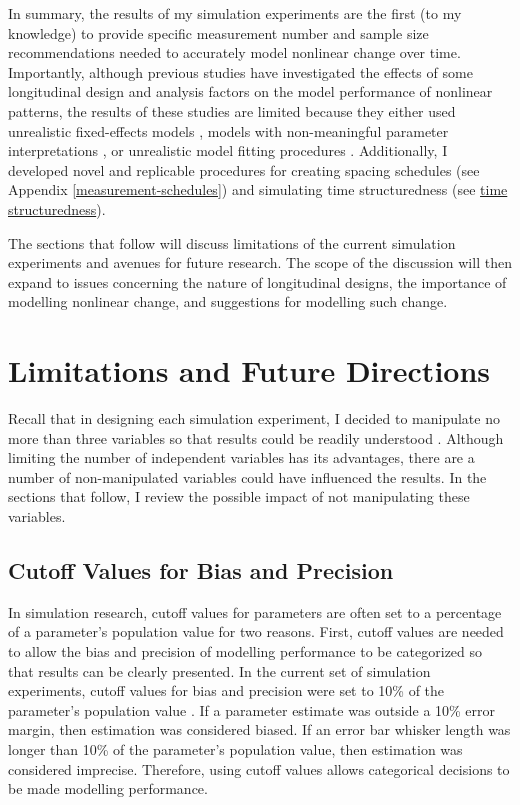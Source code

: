 \documentclass[
12pt, %
twoside,
english]{guelphthesis}
\begin{document}
In summary, the results of my simulation experiments are the first (to my knowledge) to provide specific measurement number and sample size recommendations needed to accurately model nonlinear change over time. Importantly, although previous studies have investigated the effects of some longitudinal design and analysis factors on the model performance of nonlinear patterns, the results of these studies are limited because they either used unrealistic fixed-effects models \autocite[e.g.,][]{finch2017}, models with non-meaningful parameter interpretations \autocites[e.g.,][]{fine2019,liu2022}, or unrealistic model fitting procedures \autocite{finch2017}. Additionally, I developed novel and replicable procedures for creating spacing schedules (see Appendix \ref{measurement-schedules}) and simulating time structuredness (see \protect\hyperlink{simulating-time-struc}{time structuredness}).

The sections that follow will discuss limitations of the current simulation experiments and avenues for future research. The scope of the discussion will then expand to issues concerning the nature of longitudinal designs, the importance of modelling nonlinear change, and suggestions for modelling such change.

\hypertarget{limitations-and-future-directions}{%
\section{Limitations and Future Directions}\label{limitations-and-future-directions}}

Recall that in designing each simulation experiment, I decided to manipulate no more than three variables so that results could be readily understood \autocite{halford2005}. Although limiting the number of independent variables has its advantages, there are a number of non-manipulated variables could have influenced the results. In the sections that follow, I review the possible impact of not manipulating these variables.

\hypertarget{cutoff-values-for-bias-and-precision}{%
\subsection{Cutoff Values for Bias and Precision}\label{cutoff-values-for-bias-and-precision}}

In simulation research, cutoff values for parameters are often set to a percentage of a parameter's population value \autocite[e.g.,][]{muthen1997} for two reasons. First, cutoff values are needed to allow the bias and precision of modelling performance to be categorized so that results can be clearly presented. In the current set of simulation experiments, cutoff values for bias and precision were set to 10\% of the parameter's population value \autocite{muthen1997}. If a parameter estimate was outside a 10\% error margin, then estimation was considered biased. If an error bar whisker length was longer than 10\% of the parameter's population value, then estimation was considered imprecise. Therefore, using cutoff values allows categorical decisions to be made modelling performance.
\end{document}
